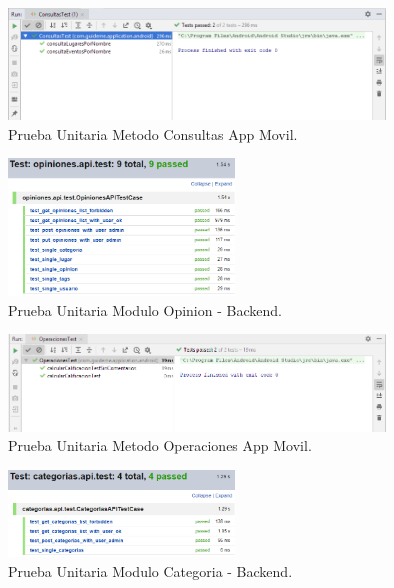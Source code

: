 \documentclass[12pt,letterpaper,openany]{book}
\begin{document}
	
\begin{figure}[H]
\begin{center}
\includegraphics[width=10cm]{./imagenes/Test/ConsultasTest}
\caption{Prueba Unitaria Metodo Consultas App Movil.}
\end{center}
\end{figure}

\begin{figure}[H]
\begin{center}
\includegraphics[width=6cm]{./imagenes/Test/Backend/Test__opiniones_api_test}
\caption{Prueba Unitaria Modulo Opinion - Backend.}
\end{center}
\end{figure}

\begin{figure}[H]
\begin{center}
\includegraphics[width=10cm]{./imagenes/Test/OperacionesTest}
\caption{Prueba Unitaria Metodo Operaciones App Movil.}
\end{center}
\end{figure}

\begin{figure}[H]
\begin{center}
\includegraphics[width=6cm]{./imagenes/Test/Backend/Test__categorias_api_test}
\caption{Prueba Unitaria Modulo Categoria - Backend.}
\end{center}
\end{figure}
\end{document}
